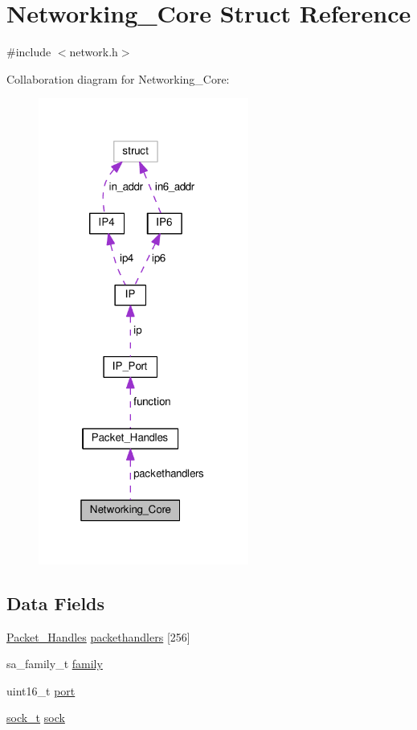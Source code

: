 \hypertarget{struct_networking___core}{\section{Networking\+\_\+\+Core Struct Reference}
\label{struct_networking___core}
}


{\ttfamily \#include $<$network.\+h$>$}



Collaboration diagram for Networking\+\_\+\+Core\+:
\nopagebreak
\begin{figure}[H]
\begin{center}
\leavevmode
\includegraphics[width=196pt]{de/df0/struct_networking___core__coll__graph}
\end{center}
\end{figure}
\subsection*{Data Fields}
\begin{DoxyCompactItemize}
\item 
\hyperlink{struct_packet___handles}{Packet\+\_\+\+Handles} \hyperlink{struct_networking___core_acf65b41b1fc6f52a40016a2329a8ba30}{packethandlers} \mbox{[}256\mbox{]}
\item 
sa\+\_\+family\+\_\+t \hyperlink{struct_networking___core_a59fa33606a579e9080aced9a5d2659de}{family}
\item 
uint16\+\_\+t \hyperlink{struct_networking___core_a8e0798404bf2cf5dabb84c5ba9a4f236}{port}
\item 
\hyperlink{network_8h_ae5faf8a8d23da59c3e3025a62039d8c1}{sock\+\_\+t} \hyperlink{struct_networking___core_a35b19d84fb632ca8ce5cab237f7089a5}{sock}
\end{DoxyCompactItemize}


